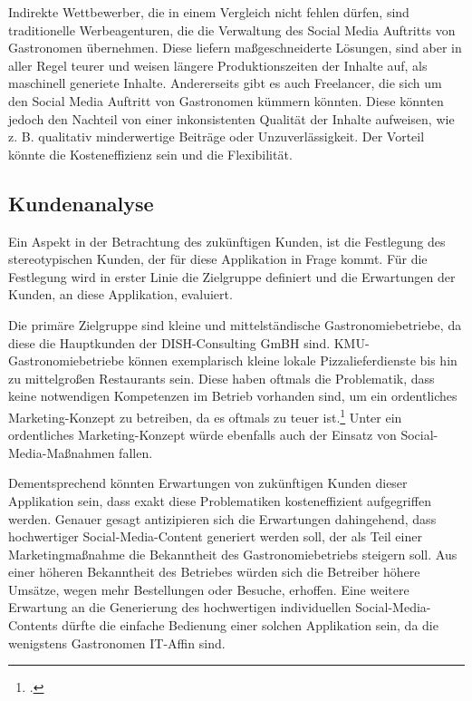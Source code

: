 Indirekte Wettbewerber, die in einem Vergleich nicht fehlen dürfen, sind traditionelle Werbeagenturen, die die Verwaltung des Social Media Auftritts von Gastronomen übernehmen.
Diese liefern maßgeschneiderte Lösungen, sind aber in aller Regel teurer und weisen längere Produktionszeiten der Inhalte auf, als maschinell generiete Inhalte.
Andererseits gibt es auch Freelancer, die sich um den Social Media Auftritt von Gastronomen kümmern könnten.
Diese könnten jedoch den Nachteil von einer inkonsistenten Qualität der Inhalte aufweisen, wie z. B. qualitativ minderwertige Beiträge oder Unzuverlässigkeit.
Der Vorteil könnte die Kosteneffizienz sein und die Flexibilität. %

\subsection{Kundenanalyse}
Ein Aspekt in der Betrachtung des zukünftigen Kunden, ist die Festlegung des stereotypischen Kunden, der für diese Applikation in Frage kommt.
Für die Festlegung wird in erster Linie die Zielgruppe definiert und die Erwartungen der Kunden, an diese Applikation, evaluiert.

Die primäre Zielgruppe sind kleine und mittelständische Gastronomiebetriebe, da diese die Hauptkunden der DISH-Consulting GmBH sind.
KMU-Gastronomiebetriebe können exemplarisch kleine lokale Pizzalieferdienste bis hin zu mittelgroßen Restaurants sein.
Diese haben oftmals die Problematik, dass keine notwendigen Kompetenzen im Betrieb vorhanden sind, um ein ordentliches Marketing-Konzept zu betreiben, da es oftmals zu teuer ist.\footcite{restroworks2024}
Unter ein ordentliches Marketing-Konzept würde ebenfalls auch der Einsatz von Social-Media-Maßnahmen fallen.

Dementsprechend könnten Erwartungen von zukünftigen Kunden dieser Applikation sein, dass exakt diese Problematiken kosteneffizient aufgegriffen werden.
Genauer gesagt antizipieren sich die Erwartungen dahingehend, dass hochwertiger Social-Media-Content generiert werden soll, der als Teil einer Marketingmaßnahme die Bekanntheit des Gastronomiebetriebs steigern soll.
Aus einer höheren Bekanntheit des Betriebes würden sich die Betreiber höhere Umsätze, wegen mehr Bestellungen oder Besuche, erhoffen.
Eine weitere Erwartung an die Generierung des hochwertigen individuellen Social-Media-Contents dürfte die einfache Bedienung einer solchen Applikation sein, da die wenigstens Gastronomen IT-Affin sind.

